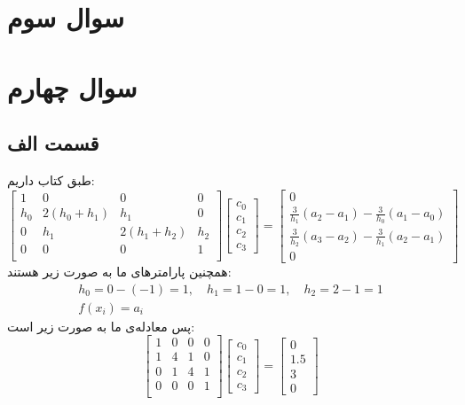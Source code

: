 \documentclass[]{article}
\begin{document}
\section*{سوال سوم}
\section*{سوال چهارم}
\subsection*{قسمت الف}
طبق کتاب داریم:
\[
\begin{bmatrix}
    1 & 0 & 0 & 0 \\
    h_0 & 2(h_0+h_1) & h_1 & 0 \\
    0 & h_1 & 2(h_1+h_2) & h_2\\
    0 & 0 & 0 & 1 \\
\end{bmatrix}
\begin{bmatrix}
    c_0\\
    c_1\\
    c_2\\
    c_3
\end{bmatrix}
=
\begin{bmatrix}
    0\\
    \frac{3}{h_1}(a_2 - a_1) - \frac{3}{h_0}(a_1 - a_0)\\
    \frac{3}{h_2}(a_3 - a_2) - \frac{3}{h_1}(a_2 - a_1)\\
    0
\end{bmatrix}
\]
همچنین پارامتر‌های ما به صورت زیر هستند:
\begin{gather*}
    h_0 = 0 - (-1) = 1, \quad h_1 = 1 - 0 = 1, \quad h_2 = 2 - 1 = 1\\
    f(x_i) = a_i
\end{gather*}
پس معادله‌ی ما به صورت زیر است:
\[
\begin{bmatrix}
    1 & 0 & 0 & 0 \\
    1 & 4 & 1 & 0 \\
    0 & 1 & 4 & 1\\
    0 & 0 & 0 & 1 \\
\end{bmatrix}
\begin{bmatrix}
    c_0\\
    c_1\\
    c_2\\
    c_3
\end{bmatrix}
=
\begin{bmatrix}
    0\\
    1.5\\
    3\\
    0
\end{bmatrix}
\]
\end{document}

